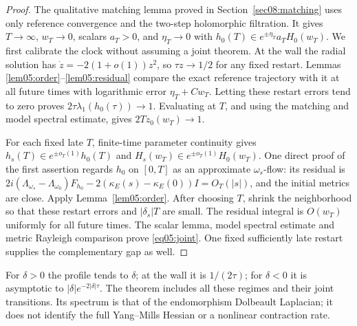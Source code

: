 \documentclass[11pt]{amsart}
\theoremstyle{definition}
\theoremstyle{remark}
\begin{document}
\begin{proof}
The qualitative matching lemma proved in Section~\ref{sec08:matching}
uses only reference convergence and the two-step holomorphic
filtration. It gives \(T\to\infty\), \(w_T\to0\), scalars
\(a_T>0\), and \(\eta_T\to0\) with
\(h_0(T)\in e^{\pm\eta_T}a_TH_0(w_T)\).
We first calibrate the clock without assuming a joint theorem.
At the wall the radial solution has \(\dot z=-2(1+o(1))z^2\),
so \(\tau z\to1/2\) for any fixed restart. Lemmas
\ref{lem05:order}--\ref{lem05:residual} compare the exact reference
trajectory with it at all future times with logarithmic error
\(\eta_T+Cw_T\). Letting these restart errors tend to zero proves
\(2\tau\lambda_1(h_0(\tau))\to1\). Evaluating at \(T\), and
using the matching and model spectral estimate, gives
\(2Tz_0(w_T)\to1\).

For each fixed late \(T\), finite-time parameter continuity gives
\(h_s(T)\in e^{\pm o_T(1)}h_0(T)\) and
\(H_s(w_T)\in e^{\pm o_T(1)}H_0(w_T)\). One direct proof of
the first assertion regards \(h_0\) on \([0,T]\) as an
approximate \(\omega_s\)-flow: its residual is
\(2i(\Lambda_{\omega_s}-\Lambda_{\omega_0})F_{h_0}
 -2(\kappa_E(s)-\kappa_E(0))I=O_T(|s|)\), and the initial
metrics are close. Apply Lemma~\ref{lem05:order}.
After choosing \(T\), shrink the neighborhood so that these
restart errors and \(|\delta_s|T\) are small. The residual integral
is \(O(w_T)\) uniformly for all future times. The scalar lemma,
model spectral estimate and metric Rayleigh comparison prove
\eqref{eq05:joint}. One fixed sufficiently late restart supplies
the complementary gap as well.
\end{proof}

For \(\delta>0\) the profile tends to \(\delta\); at the wall
it is \(1/(2\tau)\); for \(\delta<0\) it is asymptotic to
\(|\delta|e^{-2|\delta|\tau}\). The theorem includes all these
regimes and their joint transitions. Its spectrum is that of the
endomorphism Dolbeault Laplacian; it does not identify the full
Yang--Mills Hessian or a nonlinear contraction rate.
\end{document}

